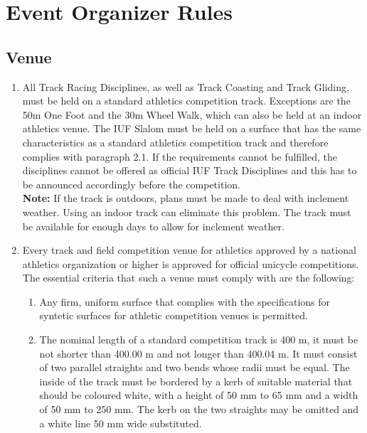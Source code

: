 \chapter{Event Organizer Rules}

\section{Venue}

\begin{enumerate}[leftmargin=1.5em,labelsep=*]
	\item All Track Racing Disciplines, as well as Track Coasting and Track Gliding, must be held on a 
  standard athletics competition track. Exceptions are the 50m One Foot and the 30m Wheel Walk, 
  which can also be held at an indoor athletics venue. The IUF Slalom must be held on a surface 
  that has the same characteristics as a standard athletics competition track and therefore 
  complies with paragraph 2.1.
	If the requirements cannot be fulfilled, the disciplines cannot be offered as official 
  IUF Track Disciplines and this has to be announced accordingly before the competition.\\

	\textbf{Note:} If the track is outdoors, plans must be made to deal with inclement weather.
	Using an indoor track can eliminate this problem.
	The track must be available for enough days to allow for inclement weather.
	
	\item Every track and field competition venue for athletics approved by a national athletics 
  organization or higher is approved for official unicycle competitions.\\
	The essential criteria that such a venue must comply with are the following:
	\begin{enumerate}[label*=\arabic*,leftmargin=1.5em,labelsep=*]
		\item Any firm, uniform surface that complies with the specifications for syntetic surfaces for 
    athletic competition venues is permitted.
		
		\item The nominal length of a standard competition track is 400 m, it must be not shorter than 
    400.00 m and not longer than 400.04 m. It must consist of two parallel straights and two bends 
    whose radii must be equal. The inside of the track must be bordered by a kerb of suitable material 
    that should be coloured white, with a height of 50 mm to 65 mm and a width of 50 mm to 250 mm.
		The kerb on the two straights may be omitted and a white line 50 mm wide substituted.
		

\end{enumerate}
\end{enumerate}
